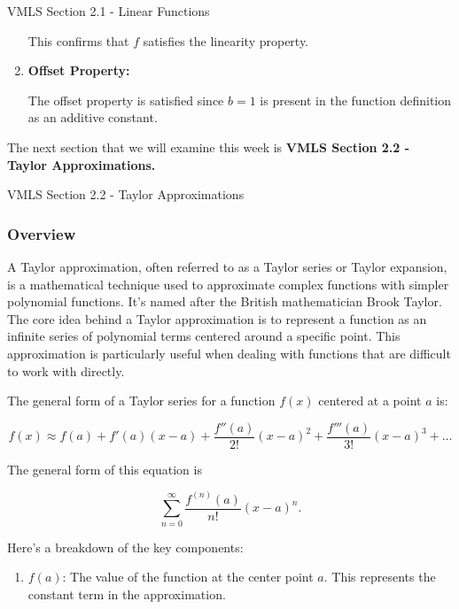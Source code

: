 \begin{notes}{VMLS Section 2.1 - Linear Functions}
\begin{highlight}
\begin{enumerate}
            This confirms that \( f \) satisfies the linearity property.
            
            \item \textbf{Offset Property:}
            
            The offset property is satisfied since \( b = 1 \) is present in the function definition as an additive constant.
        \end{enumerate}
    \end{highlight}
\end{notes}

The next section that we will examine this week is \textbf{VMLS Section 2.2 - Taylor Approximations.}

\begin{notes}{VMLS Section 2.2 - Taylor Approximations}
    \subsubsection*{Overview}

    A Taylor approximation, often referred to as a Taylor series or Taylor expansion, is a mathematical technique used to approximate complex functions with simpler polynomial functions. It's named after the British mathematician 
    Brook Taylor. The core idea behind a Taylor approximation is to represent a function as an infinite series of polynomial terms centered around a specific point. This approximation is particularly useful when dealing with functions 
    that are difficult to work with directly.
    
    The general form of a Taylor series for a function \(f(x)\) centered at a point \(a\) is:
    
    \[f(x) \approx f(a) + f'(a)(x-a) + \frac{f''(a)}{2!}(x-a)^2 + \frac{f'''(a)}{3!}(x-a)^3 + \ldots\]

    The general form of this equation is 

    \begin{equation*}
        \sum^{\infty}_{n=0} \frac{f^{(n)}(a)}{n!}(x-a)^{n}.
    \end{equation*}
    
    Here's a breakdown of the key components:
    
    \begin{enumerate}
        \item \(f(a)\): The value of the function at the center point \(a\). This represents the constant term in the approximation.
        

\end{enumerate}
\end{notes}
